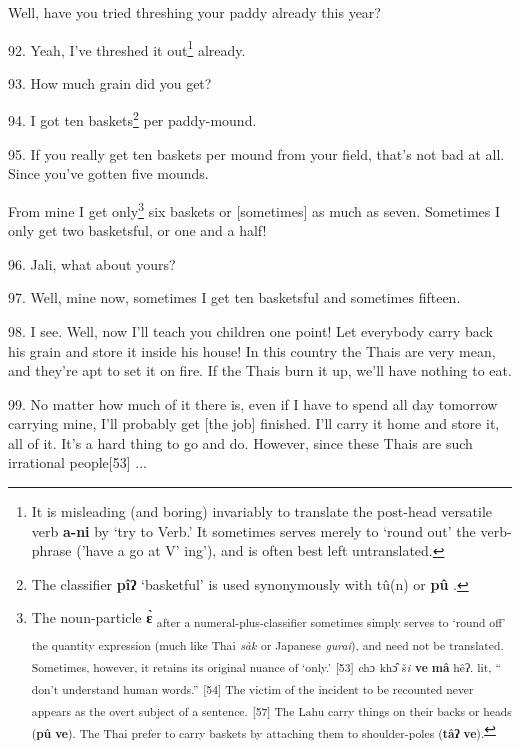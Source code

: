 Well, have you tried threshing your paddy already this year?

92. Yeah, I've threshed it out\footnote{It is misleading (and boring) invariably to translate the post-head versatile verb \textbf{a-ni} by `try to Verb.' It sometimes serves merely to `round out' the verb-phrase ('have a go at V' ing'), and is often best left untranslated.} already.

93. How much grain did you get?

94. I got ten baskets\footnote{The classifier \textbf{pîʔ} `basketful' is used synonymously with tû(n) or \textbf{pû} .} per paddy-mound.

95. If you really get ten baskets per mound from your field, that's not bad at
all. Since you've gotten five mounds.

From mine I get only\footnote{The noun-particle \textbf{ɛ̀} \textsubscript{after a numeral-plus-classifier sometimes simply serves to `round off' the quantity expression (much like Thai} \textsubscript{\textit{sàk} }\textsubscript{or Japanese} \textsubscript{\textit{gurai}}\textsubscript{), and need not be translated. Sometimes, however, it retains its original nuance of `only.'} \textsubscript{[53]} \textsubscript{ch}\textsubscript{ɔ}\textsubscript{ kh}\textsubscript{ɔ̂}\textsubscript{ š}\textsubscript{\textit{\emph{i}}}\textsubscript{ \textbf{ve} \textbf{mâ} hê}\textsubscript{ʔ. lit, `` don't understand human words.''} \textsubscript{[54] The victim of the incident to be recounted never appears as the overt subject of a sentence.}  \textsubscript{[57] The Lahu carry things on their backs or heads (\textbf{pû} \textbf{ve}). The Thai prefer to carry baskets by attaching them to shoulder-poles (\textbf{tâʔ} \textbf{ve}).}} six baskets or [sometimes] as much as seven. Sometimes
I only get two basketsful, or one and a half!

96. Jali, what about yours?

97. Well, mine now, sometimes I get ten basketsful and sometimes fifteen.

98. I see. Well, now I'll teach you children one point! Let everybody carry back
his grain and store it inside his house! In this country the Thais are very mean,
and they're apt to set it on fire. If the Thais burn it up, we'll have nothing
to eat.

99. No matter how much of it there is, even if I have to spend all day tomorrow
carrying mine, I'll probably get [the job] finished. I'll carry it home and store
it, all of it. It's a hard thing to go and do. However, since these Thais are
such irrational people[53] ...

